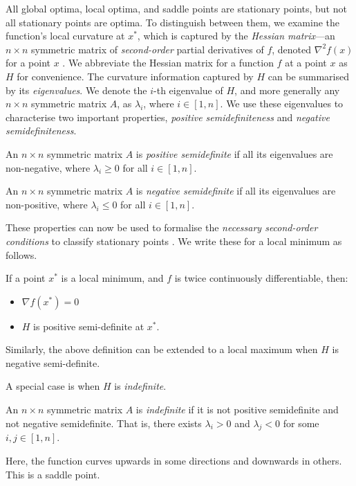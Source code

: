 All global optima, local optima, and saddle points are stationary points, but not all stationary points are optima. To distinguish between them, we examine the function's local curvature at $x^*$, which is captured by the \textit{Hessian matrix}---an $n \times n$ symmetric matrix of \textit{second-order} partial derivatives of $f$, denoted $\nabla^2 f(x)$ for a point $x$ \citep{deep_learning_book, mml_book, NoceWrig06}. We abbreviate the Hessian matrix for a function $f$ at a point $x$ as $H$ for convenience. The curvature information captured by $H$ can be summarised by its \textit{eigenvalues}. We denote the $i$-th eigenvalue of $H$, and more generally any $n \times n$ symmetric matrix $A$, as $\lambda_i$, where $i \in [1, n]$. We use these eigenvalues to characterise two important properties, \textit{positive semidefiniteness} and \textit{negative semidefiniteness}.

\begin{definition}
    An $n \times n$ symmetric matrix $A$ is \textit{positive semidefinite} if all its eigenvalues are non-negative, where $\lambda_i \geq 0$ for all $i \in [1, n]$.
\end{definition}
\begin{definition}
    An $n \times n$ symmetric matrix $A$ is \textit{negative semidefinite} if all its eigenvalues are non-positive, where $\lambda_i \leq 0$ for all $i \in [1, n]$.
\end{definition}

These properties can now be used to formalise the \textit{necessary second-order conditions} to classify stationary points \citep{NoceWrig06}. We write these for a local minimum as follows.
\begin{definition}
    If a point $x^*$ is a local minimum, and $f$ is twice continuously differentiable, then:
    \begin{itemize}
        \item $\nabla f(x^*) = 0$
        \item $H$ is positive semi-definite at $x^*$.
    \end{itemize}
    \label{definition:second_order_necessary}
\end{definition}
Similarly, the above definition can be extended to a local maximum when $H$ is negative semi-definite.

A special case is when $H$ is \textit{indefinite}.
\begin{definition}
    An $n \times n$ symmetric matrix $A$ is \textit{indefinite} if it is not positive semidefinite and not negative semidefinite. That is, there exists $\lambda_i > 0$ and $\lambda_j < 0$ for some $i, j \in [1, n]$.
\end{definition}
Here, the function curves upwards in some directions and downwards in others. This is a saddle point.

